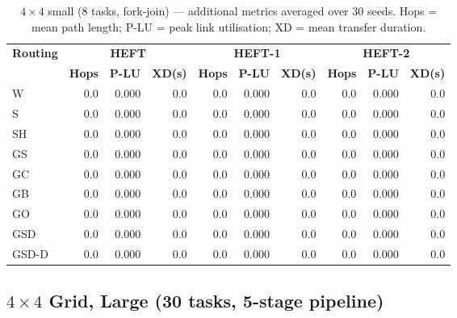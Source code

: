\documentclass[11pt]{article}
\begin{document}
\begin{table}[H]
\centering\small
\begin{tabular}{l r r r r r r r r r}
\toprule
\textbf{Routing} & \multicolumn{3}{c}{\textbf{HEFT}} & \multicolumn{3}{c}{\textbf{HEFT-1}} & \multicolumn{3}{c}{\textbf{HEFT-2}} \\
\cmidrule(lr){2-4}\cmidrule(lr){5-7}\cmidrule(lr){8-10}
& \textbf{Hops} & \textbf{P-LU} & \textbf{XD(s)} & \textbf{Hops} & \textbf{P-LU} & \textbf{XD(s)} & \textbf{Hops} & \textbf{P-LU} & \textbf{XD(s)} \\
\midrule
  W & 0.0 & 0.000 & 0.0 & 0.0 & 0.000 & 0.0 & 0.0 & 0.000 & 0.0 \\
  S & 0.0 & 0.000 & 0.0 & 0.0 & 0.000 & 0.0 & 0.0 & 0.000 & 0.0 \\
  SH & 0.0 & 0.000 & 0.0 & 0.0 & 0.000 & 0.0 & 0.0 & 0.000 & 0.0 \\
  GS & 0.0 & 0.000 & 0.0 & 0.0 & 0.000 & 0.0 & 0.0 & 0.000 & 0.0 \\
  GC & 0.0 & 0.000 & 0.0 & 0.0 & 0.000 & 0.0 & 0.0 & 0.000 & 0.0 \\
  GB & 0.0 & 0.000 & 0.0 & 0.0 & 0.000 & 0.0 & 0.0 & 0.000 & 0.0 \\
  GO & 0.0 & 0.000 & 0.0 & 0.0 & 0.000 & 0.0 & 0.0 & 0.000 & 0.0 \\
  GSD & 0.0 & 0.000 & 0.0 & 0.0 & 0.000 & 0.0 & 0.0 & 0.000 & 0.0 \\
  GSD-D & 0.0 & 0.000 & 0.0 & 0.0 & 0.000 & 0.0 & 0.0 & 0.000 & 0.0 \\
\bottomrule
\end{tabular}
\caption{$4\times4$ small (8 tasks, fork-join) --- additional metrics averaged over 30 seeds. Hops = mean path length; P-LU = peak link utilisation; XD = mean transfer duration.}
\end{table}

\subsection{$4\times4$ Grid, Large (30 tasks, 5-stage pipeline)}
\end{document}

